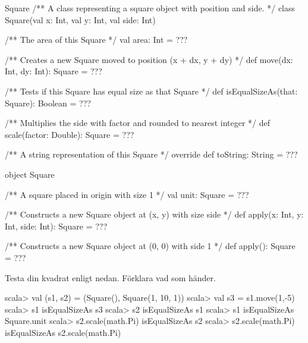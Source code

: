 \begin{ScalaSpec}{Square}
/** A class representing a square object with position and side. */
class Square(val x: Int, val y: Int, val side: Int) {
  /** The area of this Square */
  val area: Int = ???

  /** Creates a new Square moved to position (x + dx, y + dy) */
  def move(dx: Int, dy: Int): Square = ???

  /** Tests if this Square has equal size as that Square */
  def isEqualSizeAs(that: Square): Boolean = ???

  /** Multiplies the side with factor and rounded to nearest integer */
  def scale(factor: Double): Square = ???

  /** A string representation of this Square */
  override def toString: String = ???
}

object Square {
  /** A square placed in origin with size 1 */
  val unit: Square = ???

  /** Constructs a new Square object at (x, y) with size side */
  def apply(x: Int, y: Int, side: Int): Square = ???

  /** Constructs a new Square object at (0, 0) with side 1 */
  def apply(): Square = ???
}
\end{ScalaSpec}

\Subtask Testa din kvadrat enligt nedan. Förklara vad som händer.

\begin{REPL}
scala> val (s1, s2) = (Square(), Square(1, 10, 1))
scala> val s3 = s1.move(1,-5)
scala> s1 isEqualSizeAs s3
scala> s2 isEqualSizeAs s1
scala> s1 isEqualSizeAs Square.unit
scala> s2.scale(math.Pi) isEqualSizeAs s2
scala> s2.scale(math.Pi) isEqualSizeAs s2.scale(math.Pi)
\end{REPL}

\SOLUTION


\TaskSolved \what

